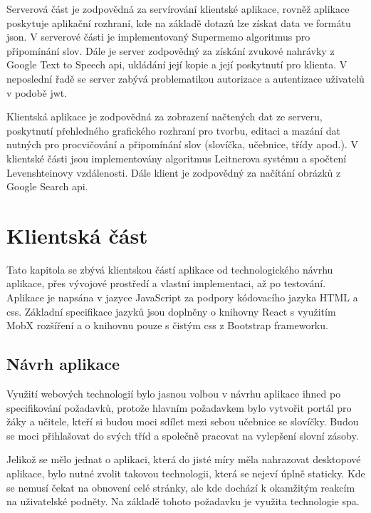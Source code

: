 \documentclass[a4paper,11pt,titlepage,fleqn]{article}
\begin{document}
        Serverová část je zodpovědná za servírování klientské aplikace, rovněž aplikace poskytuje aplikační rozhraní, kde na základě dotazů lze získat data ve formátu \gls{json}. V serverové části je implementovaný Supermemo algoritmus pro připomínání slov. Dále je server zodpovědný za získání zvukové nahrávky z Google Text to Speech \gls{api}, ukládání její kopie a její poskytnutí pro klienta. V neposlední řadě se server zabývá problematikou autorizace a autentizace uživatelů v podobě \gls{jwt}. 

        Klientská aplikace je zodpovědná za zobrazení načtených dat ze serveru, poskytnutí přehledného grafického rozhraní pro tvorbu, editaci a mazání dat nutných pro procvičování a připomínání slov (slovíčka, učebnice, třídy apod.). V klientské části jsou implementovány algoritmus Leitnerova systému a spočtení Levenshteinovy vzdálenosti. Dále klient je zodpovědný za načítání obrázků z Google Search \gls{api}.


\newpage
\section{Klientská část}
    
    Tato kapitola se zbývá klientskou částí aplikace od technologického návrhu aplikace, přes vývojové prostředí a vlastní implementaci, až po testování. Aplikace je napsána v jazyce JavaScript za podpory kódovacího jazyka HTML a \gls{css}. Základní specifikace jazyků jsou doplněny o knihovny React s využitím MobX rozšíření a o knihovnu pouze s čistým \gls{css} z Bootstrap frameworku.

    \subsection{Návrh aplikace}
        Využití webových technologií bylo jasnou volbou v návrhu aplikace ihned po specifikování požadavků, protože hlavním požadavkem bylo vytvořit portál pro žáky a učitele, kteří si budou moci sdílet mezi sebou učebnice se slovíčky. Budou se moci přihlašovat do svých tříd a společně pracovat na vylepšení slovní zásoby. 

        Jelikož se mělo jednat o aplikaci, která do jisté míry měla nahrazovat desktopové aplikace, bylo nutné zvolit takovou technologii, která se nejeví úplně staticky. Kde se nemusí čekat na obnovení celé stránky, ale kde dochází k okamžitým reakcím na uživatelské podněty. Na základě tohoto požadavku je využita technologie \gls{spa}.
\end{document}
